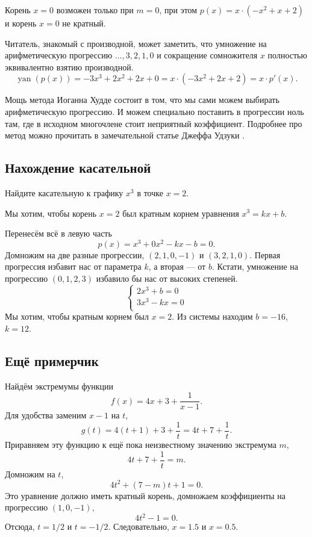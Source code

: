 \documentclass[12pt]{article}
\DeclareMathOperator{\yan}{yan}
\begin{document}
Корень $x = 0$ возможен только при $m = 0$, при этом  $p(x) = x\cdot (-x^2 + x + 2)$ и корень $x = 0$ не кратный. 

Читатель, знакомый с производной, может заметить, что умножение на арифметическую прогрессию $\dots, 3, 2, 1, 0$ и сокращение сомножителя $x$ полностью эквивалентно взятию производной. 
\[
\yan(p(x)) = -3x^3 + 2x^2 + 2x + 0 = x \cdot (-3x^2 + 2x + 2) = x \cdot p'(x).
\]

Мощь метода Иоганна Худде состоит в том, что мы сами можем выбирать арифметическую прогрессию. 
И можем специально поставить в прогрессии ноль там, где в исходном многочлене стоит неприятный коэффициент.
Подробнее про метод можно прочитать в замечательной статье Джеффа Удзуки \cite{uzuki2005lost}.

\subsection*{Нахождение касательной}

Найдите касательную к графику $x^3$ в точке $x = 2$.

Мы хотим, чтобы корень $x = 2$ был кратным корнем уравнения $x^3 = kx + b$.

Перенесём всё в левую часть 
\[
p(x)  = x^3 + 0x^2 - kx - b = 0.
\]
Домножим на две разные прогрессии, $(2, 1, 0, -1)$ и $(3, 2, 1, 0)$.
Первая прогрессия избавит нас от параметра $k$, а вторая — от $b$.
Кстати, умножение на прогрессию $(0, 1, 2, 3)$ избавило бы нас от высоких степеней.
\[
\begin{cases}
    2x^3 + b = 0 \\
    3x^3 - kx = 0 \\
\end{cases}
\]
Мы хотим, чтобы кратным корнем был $x = 2$.
Из системы находим $b = - 16$, $k = 12$.


\subsection*{Ещё примерчик}

Найдём экстремумы функции 
\[
f(x) = 4x + 3 + \frac{1}{x - 1}.
\]
Для удобства заменим $x - 1$ на $t$,
\[
g(t) = 4(t + 1) + 3 + \frac{1}{t} = 4t + 7 + \frac{1}{t}.
\]
Приравняем эту функцию к ещё пока неизвестному значению экстремума $m$,
\[
4t + 7 + \frac{1}{t} = m.
\]
Домножим на $t$, 
\[
4t^2 + (7 - m) t + 1 = 0.
\]
Это уравнение должно иметь кратный корень, домножаем коэффициенты на прогрессию $(1, 0, -1)$,
\[
4t^2 - 1 = 0.
\]
Отсюда, $t = 1/2$ и $t = -1/2$.
Следовательно, $x = 1.5$ и $x = 0.5$.
\end{document}
